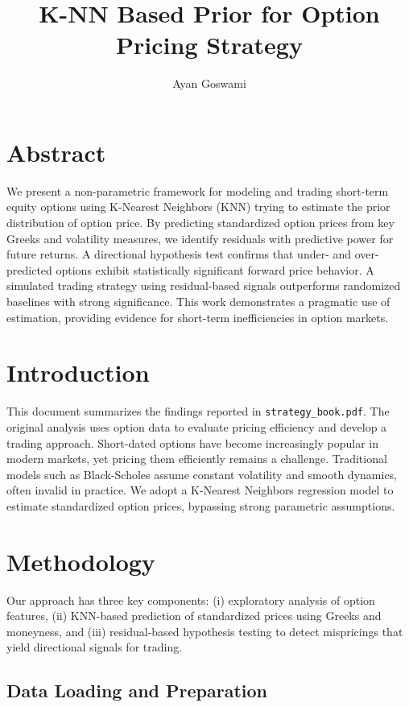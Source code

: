 \documentclass{article}
\title{K-NN Based Prior for Option Pricing Strategy}
\author{Ayan Goswami}
\date{}
\begin{document}
\maketitle
\section{Abstract}

We present a non-parametric framework for modeling and trading short-term equity options using K-Nearest Neighbors (KNN) trying to estimate the prior distribution of option price. By predicting standardized option prices from key Greeks and volatility measures, we identify residuals with predictive power for future returns. A directional hypothesis test confirms that under- and over-predicted options exhibit statistically significant forward price behavior. A simulated trading strategy using residual-based signals outperforms randomized baselines with strong significance. This work demonstrates a pragmatic use of estimation, providing evidence for short-term inefficiencies in option markets.

\section{Introduction}

This document summarizes the findings reported in \texttt{strategy\_book.pdf}. The original analysis uses option data to evaluate pricing efficiency and develop a trading approach. Short-dated options have become increasingly popular in modern markets, yet pricing them efficiently remains a challenge. Traditional models such as Black-Scholes assume constant volatility and smooth dynamics, often invalid in practice. We adopt a K-Nearest Neighbors regression model to estimate standardized option prices, bypassing strong parametric assumptions.

\section{Methodology}

Our approach has three key components: (i) exploratory analysis of option features, (ii) KNN-based prediction of standardized prices using Greeks and moneyness, and (iii) residual-based hypothesis testing to detect mispricings that yield directional signals for trading.

\subsection{Data Loading and Preparation}
\end{document}
